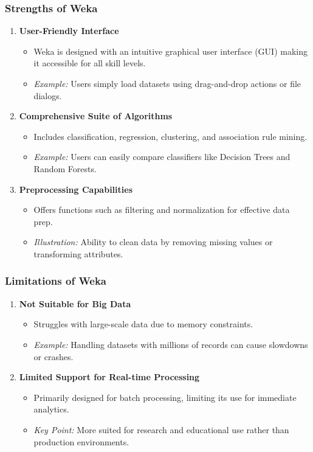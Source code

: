 \documentclass[aspectratio=169]{beamer}
\begin{document}
\begin{frame}[fragile]
    \frametitle{Strengths of Weka}
    \begin{enumerate}
        \item \textbf{User-Friendly Interface}
        \begin{itemize}
            \item Weka is designed with an intuitive graphical user interface (GUI) making it accessible for all skill levels.
            \item \textit{Example:} Users simply load datasets using drag-and-drop actions or file dialogs.
        \end{itemize}

        \item \textbf{Comprehensive Suite of Algorithms}
        \begin{itemize}
            \item Includes classification, regression, clustering, and association rule mining.
            \item \textit{Example:} Users can easily compare classifiers like Decision Trees and Random Forests.
        \end{itemize}

        \item \textbf{Preprocessing Capabilities}
        \begin{itemize}
            \item Offers functions such as filtering and normalization for effective data prep.
            \item \textit{Illustration:} Ability to clean data by removing missing values or transforming attributes.
        \end{itemize}
    \end{enumerate}
\end{frame}

\begin{frame}[fragile]
    \frametitle{Limitations of Weka}
    \begin{enumerate}
        \item \textbf{Not Suitable for Big Data}
        \begin{itemize}
            \item Struggles with large-scale data due to memory constraints.
            \item \textit{Example:} Handling datasets with millions of records can cause slowdowns or crashes.
        \end{itemize}

        \item \textbf{Limited Support for Real-time Processing}
        \begin{itemize}
            \item Primarily designed for batch processing, limiting its use for immediate analytics.
            \item \textit{Key Point:} More suited for research and educational use rather than production environments.
        \end{itemize}
    \end{enumerate}
\end{frame}
\end{document}
